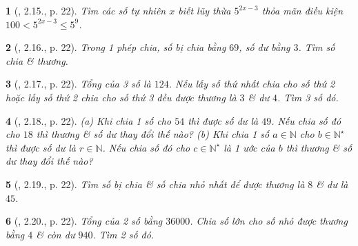 \documentclass{article}
\newtheorem{baitoan}{}
\begin{document}
\begin{baitoan}[\cite{Binh_boi_duong_Toan_6_tap_1}, 2.15., p. 22]
	Tìm các số tự nhiên $x$ biết lũy thừa $5^{2x - 3}$ thỏa mãn điều kiện $100 < 5^{2x - 3}\le5^9$.
\end{baitoan}

\begin{baitoan}[\cite{Binh_boi_duong_Toan_6_tap_1}, 2.16., p. 22]
	Trong 1 phép chia, số bị chia bằng $69$, số dư bằng $3$. Tìm số chia \& thương.
\end{baitoan}

\begin{baitoan}[\cite{Binh_boi_duong_Toan_6_tap_1}, 2.17., p. 22]
	Tổng của 3 số là $124$. Nếu lấy số thứ nhất chia cho số thứ 2 hoặc lấy số thứ 2 chia cho số thứ 3 đều được thương là $3$ \& dư $4$. Tìm 3 số đó.
\end{baitoan}

\begin{baitoan}[\cite{Binh_boi_duong_Toan_6_tap_1}, 2.18., p. 22]
	(a) Khi chia 1 số cho $54$ thì được số dư là $49$. Nếu chia số đó cho $18$ thì thương \& số dư thay đổi thế nào? (b) Khi chia 1 số $a\in\mathbb{N}$ cho $b\in\mathbb{N}^\star$ thì được số dư là $r\in\mathbb{N}$. Nếu chia số đó cho $c\in\mathbb{N}^\star$ là 1 ước của $b$ thì thương \& số dư thay đổi thế nào?
\end{baitoan}

\begin{baitoan}[\cite{Binh_boi_duong_Toan_6_tap_1}, 2.19., p. 22]
	Tìm số bị chia \& số chia nhỏ nhất để được thương là $8$ \& dư là $45$.
\end{baitoan}

\begin{baitoan}[\cite{Binh_boi_duong_Toan_6_tap_1}, 2.20., p. 22]
	Tổng của 2 số bằng $36000$. Chia số lớn cho số nhỏ được thương bằng $4$ \& còn dư $940$. Tìm 2 số đó.
\end{baitoan}
\end{document}
